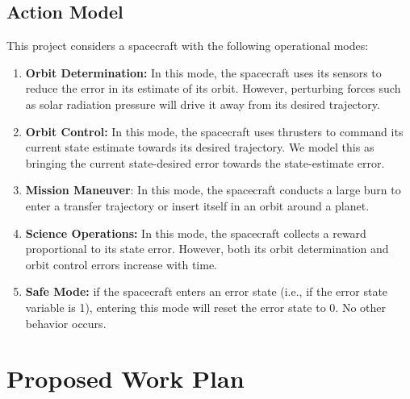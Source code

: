 \documentclass[]{article}
\begin{document}
\subsection{Action Model}
This project considers a spacecraft with the following operational modes:
\begin{enumerate}
	\item \textbf{Orbit Determination:} In this mode, the spacecraft uses its sensors to reduce the error in its estimate of its orbit. However, perturbing forces such as solar radiation pressure will drive it away from its desired trajectory.
	
	\item \textbf{Orbit Control:} In this mode, the spacecraft uses thrusters to command its current state estimate towards its desired trajectory. We model this as bringing the current state-desired error towards the state-estimate error. 
	
	\item \textbf{Mission Maneuver}: In this mode, the spacecraft conducts a large burn to enter a transfer trajectory or insert itself in an orbit around a planet. 
	
	\item \textbf{Science Operations:} In this mode, the spacecraft collects a reward proportional to its state error. However, both its orbit determination and orbit control errors increase with time.
	
	\item \textbf{Safe Mode:} if the spacecraft enters an error state (i.e., if the error state variable is 1), entering this mode will reset the error state to 0. No other behavior occurs. 
\end{enumerate} 

\section{Proposed Work Plan}
\end{document}
